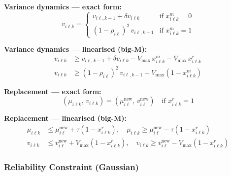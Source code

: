 \documentclass[11pt,a4paper]{article}
\begin{document}
\textbf{Variance dynamics --- exact form:}
\begin{equation}
  v_{i\ell k} = \begin{cases}
    v_{i\ell,k-1} + \delta v_{i\ell k} & \text{if } x^m_{i\ell k} = 0 \\
    (1-\rho_{i\ell})^2\,v_{i\ell,k-1} & \text{if } x^m_{i\ell k} = 1
  \end{cases}
\end{equation}

\textbf{Variance dynamics --- linearised (big-M):}
\begin{align}
  v_{i\ell k} &\geq v_{i\ell,k-1} + \delta v_{i\ell k} - V_{\max}\,x^m_{i\ell k}
    - V_{\max}\,x^r_{i\ell k} \\
  v_{i\ell k} &\geq (1-\rho_{i\ell})^2\,v_{i\ell,k-1} - V_{\max}(1-x^m_{i\ell k})
\end{align}

\textbf{Replacement --- exact form:}
\begin{equation}
  (\mu_{i\ell k},\, v_{i\ell k}) = (\mu^{\mathrm{new}}_{i\ell},\, v^{\mathrm{new}}_{i\ell})
  \quad \text{if } x^r_{i\ell k} = 1
  \label{eq:g_rep}
\end{equation}

\textbf{Replacement --- linearised (big-M):}
\begin{align}
  \mu_{i\ell k} &\leq \mu^{\mathrm{new}}_{i\ell} + \tau(1-x^r_{i\ell k}), \quad
  \mu_{i\ell k} \geq \mu^{\mathrm{new}}_{i\ell} - \tau(1-x^r_{i\ell k}) \\
  v_{i\ell k} &\leq v^{\mathrm{new}}_{i\ell} + V_{\max}(1-x^r_{i\ell k}), \quad
  v_{i\ell k} \geq v^{\mathrm{new}}_{i\ell} - V_{\max}(1-x^r_{i\ell k})
\end{align}


\subsubsection{Reliability Constraint (Gaussian)}
\end{document}
